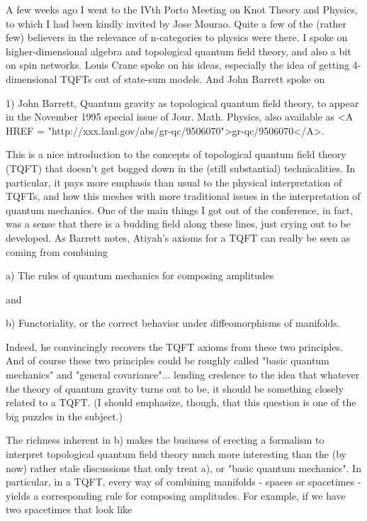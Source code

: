 

A few weeks ago I went to the IVth Porto Meeting on Knot Theory and
Physics, to which I had been kindly invited by Jose Mourao.  Quite 
a few of the (rather few) believers in the relevance of n-categories to physics
were there.  I spoke on higher-dimensional algebra and topological quantum
field theory, and also a bit on spin networks.  Louis Crane spoke on his ideas, 
especially the idea of getting 4-dimensional TQFTs out of state-sum
models.  And John Barrett spoke on 

1)  John Barrett, Quantum gravity as topological quantum field theory, to 
appear in the November 1995 special issue of Jour. Math. Physics, also 
available as <A HREF = "http://xxx.lanl.gov/abs/gr-qc/9506070">gr-qc/9506070</A>.

This is a nice introduction to the concepts of topological quantum field
theory (TQFT) that doesn't get bogged down in the (still substantial) 
technicalities.  In particular, it pays more emphasis than usual to the physical
interpretation of TQFTs, and how this meshes with more traditional issues
in the interpretation of quantum mechanics.  One of the main things
I got out of the conference, in fact, was a sense that there is a budding field
along these lines, just crying out to be developed.  As Barrett notes, Atiyah's
axioms for a TQFT can really be seen as coming from combining 

a) The rules of quantum mechanics for composing amplitudes

and 

b) Functoriality, or the correct behavior under diffeomorphisms of manifolds.

Indeed, he convincingly recovers the TQFT axioms from these two principles.
And of course these two principles could be roughly called "basic quantum
mechanics" and "general covariance"... lending credence to the idea that 
whatever the theory of quantum gravity turns out to be, it should be 
something closely related to a TQFT.  (I should emphasize, though, 
that this question is one of the big puzzles in the subject.) 

The richness inherent in b) makes the business of erecting a formalism
to interpret topological quantum field theory much more interesting than the
(by now) rather stale discussions that only treat a), or "basic quantum 
mechanics".  In particular, in a TQFT, every way of combining 
manifolds - spaces or spacetimes - yields a corresponding rule for 
composing amplitudes.  For example, if we have two spacetimes that look 
like

